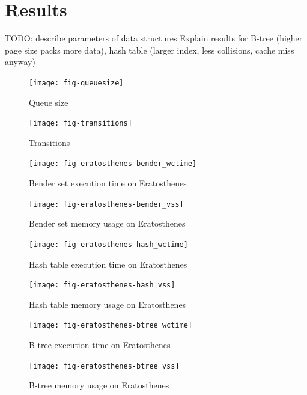 \documentclass{acm_proc_article-sp}
\begin{document}

\section{Results}

TODO: describe parameters of data structures
Explain results for B-tree (higher page size packs more data), hash table (larger index, less collisions, cache miss anyway)

\begin{figure}
\centering
\texttt{[image: fig-queuesize]}
\caption{Queue size}
\label{fig-quesize}
\end{figure}

\begin{figure}
\centering
\texttt{[image: fig-transitions]}
\caption{Transitions}
\label{fig-transitions}
\end{figure}

\begin{figure}
\centering
\texttt{[image: fig-eratosthenes-bender\_wctime]}
\caption{Bender set execution time on Eratosthenes}
\label{fig-eratosthenes-bender_wctime}
\end{figure}

\begin{figure}
\centering
\texttt{[image: fig-eratosthenes-bender\_vss]}
\caption{Bender set memory usage on Eratosthenes}
\label{fig-eratosthenes-bender_vss}
\end{figure}

\begin{figure}
\centering
\texttt{[image: fig-eratosthenes-hash\_wctime]}
\caption{Hash table execution time on Eratosthenes}
\label{fig-eratosthenes-hash_wctime}
\end{figure}

\begin{figure}
\centering
\texttt{[image: fig-eratosthenes-hash\_vss]}
\caption{Hash table memory usage on Eratosthenes}
\label{fig-eratosthenes-hash_vss}
\end{figure}

\begin{figure}
\centering
\texttt{[image: fig-eratosthenes-btree\_wctime]}
\caption{B-tree execution time on Eratosthenes}
\label{fig-eratosthenes-btree_wctime}
\end{figure}

\begin{figure}
\centering
\texttt{[image: fig-eratosthenes-btree\_vss]}
\caption{B-tree memory usage on Eratosthenes}
\label{fig-eratosthenes-btree_vss}
\end{figure}
\end{document}
